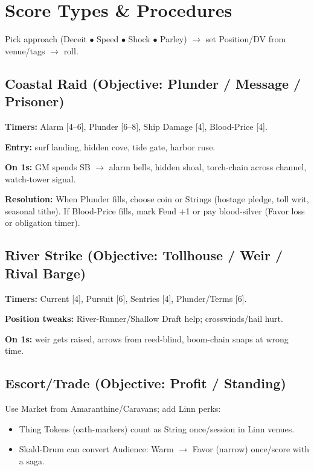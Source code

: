 \documentclass[11pt]{article}
\begin{document}
\section{Score Types \& Procedures}

Pick approach (Deceit $\bullet$ Speed $\bullet$ Shock $\bullet$ Parley) $\rightarrow$ set Position/DV from venue/tags $\rightarrow$ roll.

\subsection{Coastal Raid (Objective: Plunder / Message / Prisoner)}

\textbf{Timers:} Alarm [4--6], Plunder [6--8], Ship Damage [4], Blood-Price [4].

\textbf{Entry:} surf landing, hidden cove, tide gate, harbor ruse.

\textbf{On 1s:} GM spends SB $\rightarrow$ alarm bells, hidden shoal, torch-chain across channel, watch-tower signal.

\textbf{Resolution:} When Plunder fills, choose coin or Strings (hostage pledge, toll writ, seasonal tithe). If Blood-Price fills, mark Feud +1 or pay blood-silver (Favor loss or obligation timer).

\subsection{River Strike (Objective: Tollhouse / Weir / Rival Barge)}

\textbf{Timers:} Current [4], Pursuit [6], Sentries [4], Plunder/Terms [6].

\textbf{Position tweaks:} River-Runner/Shallow Draft help; crosswinds/hail hurt.

\textbf{On 1s:} weir gets raised, arrows from reed-blind, boom-chain snaps at wrong time.

\subsection{Escort/Trade (Objective: Profit / Standing)}

Use Market from Amaranthine/Caravans; add Linn perks:
\begin{itemize}
\item Thing Tokens (oath-markers) count as String once/session in Linn venues.
\item Skald-Drum can convert Audience: Warm $\rightarrow$ Favor (narrow) once/score with a saga.
\end{itemize}
\end{document}
